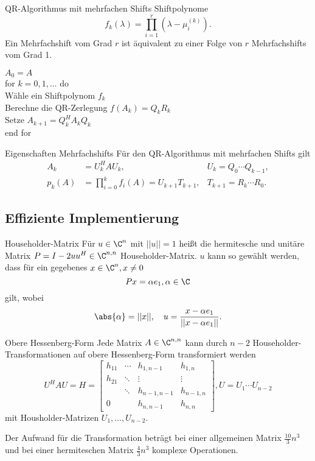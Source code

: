 \begin{karte}{QR-Algorithmus mit mehrfachen Shifts}
    Shiftpolynome \[ f_k(\lambda) = \prod_{i=1}^r (\lambda - \mu_i^{(k)}). \]
    Ein Mehrfachshift vom Grad \(r\) ist äquivalent zu einer Folge von \(r\) 
    Mehrfachshifts vom Grad 1.
    \begin{tabbing}
        \( A_0 = A \) \\
        for \= \( k = 0,1,\ldots \) do \\
        \> Wähle ein Shiftpolynom \(f_k\) \\
        \> Berechne die QR-Zerlegung \( f(A_k) = Q_k R_k \) \\
        \> Setze \( A_{k+1} = Q_k^H A_k Q_k \) \\
        end for
    \end{tabbing}
\end{karte}

\begin{karte}{Eigenschaften Mehrfachshifts}
    Für den QR-Algorithmus mit mehrfachen Shifts gilt 
    \begin{align*}
        A_k &= U_k^H A U_k, &U_k = Q_0 \cdots Q_{k-1}, \\
        p_k(A) &= \prod_{i=0}^k f_i(A) = U_{k+1} T_{k+1}, &T_{k+1} = R_k \cdots R_0.
    \end{align*}
\end{karte}

\subsection{Effiziente Implementierung}

\begin{karte}{Householder-Matrix}
    Für \( u\in \C^n \) mit \( ||u|| = 1 \) heißt die 
    hermitesche und unitäre Matrix \( P = I - 2 u u^H \in \C^{n,n} \) 
    Householder-Matrix. \(u\) kann so gewählt werden, dass für ein gegebenes 
    \( x\in \C^n, x\neq 0 \)
    \[ Px = \alpha e_1, \alpha \in \C \]
    gilt, wobei 
    \[ \abs{\alpha} = ||x||, \quad u = \frac{x-\alpha e_1}{||x-\alpha e_1||}. \]
\end{karte}

\begin{karte}{Obere Hessenberg-Form}
    Jede Matrix \(A\in \C^{n,n}\) kann durch \(n-2\) Householder-Transformationen 
    auf obere Hessenberg-Form transformiert werden 
    \[ U^H A U = H = \left[ \begin{matrix}
        h_{11} & \cdots & h_{1,n-1} & h_{1,n} \\
        h_{21} & \ddots & \vdots & \vdots \\
        & \ddots & h_{n-1, n-1} & h_{n-1,n} \\
        0 & & h_{n,n-1} & h_{n,n}
    \end{matrix} \right], U = U_1 \cdots U_{n-2} \]
    mit Housholder-Matrizen \(U_1, \ldots, U_{n-2}\). 

    Der Aufwand für die Transformation beträgt bei einer allgemeinen Matrix 
    \(\frac{10}{3} n^3\) und bei einer hermiteschen Matrix \( \frac{4}{3}n^3 \)
    komplexe Operationen.
\end{karte}


